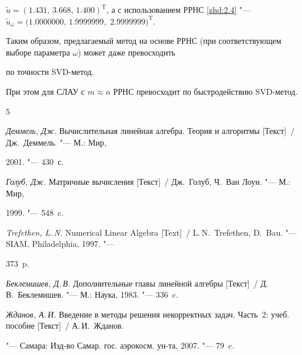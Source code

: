 $\tilde u=(1.431,\, 3.668,\, 1.400)^\mathrm{T}$, а с использованием РРНС \eqref{zhd:2.4} "--- $\tilde u_\omega=

(1.0000000,\, 1.9999999,$ $2.9999999)^\mathrm{T}$.



Таким образом, предлагаемый метод на основе РРНС (при соответствующем выборе параметра $\omega$) может даже превосходить 

по точности SVD-метод.

При этом для СЛАУ с $m\approx n$ РРНС превосходит по быстродействию SVD-метод.



\begin{thebibliography}{5}




\emph{Деммель, Дж.} Вычислительная линейная алгебра. Теория и алгоритмы [Текст]~/ Дж.~Деммель. "--- М.: Мир,

2001. "--- 430~с.




\emph{Голуб, Дж.} Матричные вычисления [Текст]~/ Дж.~Голуб, Ч.~Ван Лоун. "--- М.: Мир,

1999. "--- 548~c.




\emph{Trefethen, L.\,N.} Numerical Linear Algebra [Text]~/ L.\,N.~Trefethen, D.~Bau. "--- SIAM, Philadelphia, 1997. "---

373~p.




\emph{Беклемишев, Д.\,В.} Дополнительные главы линейной алгебры [Текст]~/ Д.\,В.~Беклемишев. "--- М.: Наука, 1983. "--- 336~c.




\emph{Жданов, А.\,И.} Введение в методы решения некорректных задач. Часть~2: учеб. пособие [Текст]~/ А.\,И.~Жданов.

"--- Самара: Изд-во Самар. гос. аэрокосм. ун-та, 2007. "--- 79~c.



\end{thebibliography}



\vspace{.8cm}





\newpage



\lfoot[]{}

  \rfoot[]{}



\makeengtitle








%

